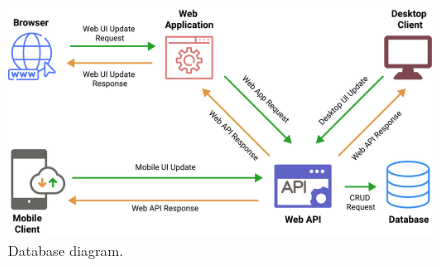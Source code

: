 \begin{figure}[H]
    \centering
    \includegraphics[width=1\textwidth]{Pictures/Threat_Modeling}
    \caption{Database diagram.}\label{fig:figure6}
\end{figure}

